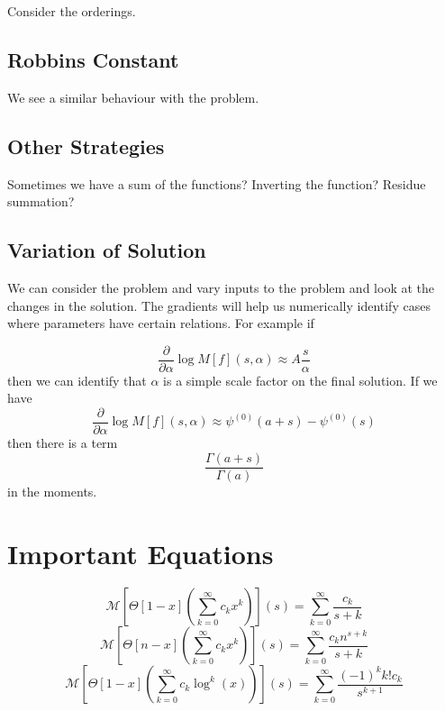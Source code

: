 \documentclass[journal=jcisd8,manuscript=article,layout=onecolumn,pdftex,floatfix,amsmath,amssymb,10pt]{achemso}
\begin{document}
Consider the orderings.

\subsection{Robbins Constant}
We see a similar behaviour with the problem.

\subsection{Other Strategies}
Sometimes we have a sum of the functions?
Inverting the function? Residue summation?

\subsection{Variation of Solution}
We can consider the problem and vary inputs to the problem and look at the changes in the solution. The gradients will help us numerically identify cases where parameters have certain relations. For example if 

\begin{equation}
\frac{\partial}{\partial \alpha} \log M[f](s,\alpha) \approx A\frac{s}{\alpha}
\end{equation}
then we can identify that $\alpha$ is a simple scale factor on the final solution. If we have \begin{equation}
\frac{\partial}{\partial \alpha} \log M[f](s,\alpha) \approx \psi^{(0)}(a+s) - \psi^{(0)}(s)
\end{equation}
then there is a term 
\begin{equation}
\frac{\Gamma(a+s)}{\Gamma(a)}
\end{equation}
in the moments.

\section{Important Equations}
\begin{equation}
\mathcal{M}\left[\Theta[1-x]\left(\sum_{k=0}^\infty c_k x^k \right)\right](s) = \sum_{k=0}^\infty \frac{c_k}{s+k}
\end{equation}
\begin{equation}
\mathcal{M}\left[\Theta[n-x]\left(\sum_{k=0}^\infty c_k  x^k \right)\right](s) = \sum_{k=0}^\infty \frac{c_k n^{s+k}}{s+k}
\end{equation}
\begin{equation}
\mathcal{M}\left[\Theta[1-x]\left(\sum_{k=0}^\infty c_k \log^k(x) \right)\right](s) = \sum_{k=0}^\infty \frac{(-1)^k k! c_k}{s^{k+1}}
\end{equation}
\end{document}
